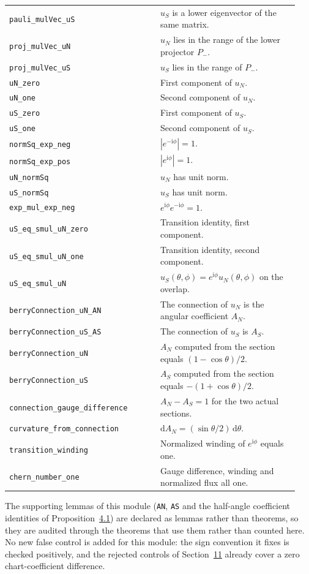\documentclass[11pt]{article}
\theoremstyle{definition}\newtheorem{definition}[theorem]{Definition}
\theoremstyle{remark}\newtheorem{remark}[theorem]{Remark}
\newcommand{\ii}{\mathrm{i}}
\newcommand{\dd}{\mathrm{d}}
\begin{document}
\begin{longtable}{p{0.49\linewidth}p{0.45\linewidth}}
\texttt{pauli\_mulVec\_uS} & $u_S$ is a lower eigenvector of the same matrix.\\
\texttt{proj\_mulVec\_uN} & $u_N$ lies in the range of the lower projector $P_-$.\\
\texttt{proj\_mulVec\_uS} & $u_S$ lies in the range of $P_-$.\\
\texttt{uN\_zero} & First component of $u_N$.\\
\texttt{uN\_one} & Second component of $u_N$.\\
\texttt{uS\_zero} & First component of $u_S$.\\
\texttt{uS\_one} & Second component of $u_S$.\\
\texttt{normSq\_exp\_neg} & $|e^{-\ii\phi}|=1$.\\
\texttt{normSq\_exp\_pos} & $|e^{\ii\phi}|=1$.\\
\texttt{uN\_normSq} & $u_N$ has unit norm.\\
\texttt{uS\_normSq} & $u_S$ has unit norm.\\
\texttt{exp\_mul\_exp\_neg} & $e^{\ii\phi}e^{-\ii\phi}=1$.\\
\texttt{uS\_eq\_smul\_uN\_zero} & Transition identity, first component.\\
\texttt{uS\_eq\_smul\_uN\_one} & Transition identity, second component.\\
\texttt{uS\_eq\_smul\_uN} & $u_S(\theta,\phi)=e^{\ii\phi}u_N(\theta,\phi)$ on the overlap.\\
\texttt{berryConnection\_uN\_AN} & The connection of $u_N$ is the angular coefficient $A_N$.\\
\texttt{berryConnection\_uS\_AS} & The connection of $u_S$ is $A_S$.\\
\texttt{berryConnection\_uN} & $A_N$ computed from the section equals $(1-\cos\theta)/2$.\\
\texttt{berryConnection\_uS} & $A_S$ computed from the section equals $-(1+\cos\theta)/2$.\\
\texttt{connection\_gauge\_difference} & $A_N-A_S=1$ for the two actual sections.\\
\texttt{curvature\_from\_connection} & $\dd A_N=(\sin\theta/2)\,\dd\theta$.\\
\texttt{transition\_winding} & Normalized winding of $e^{\ii\phi}$ equals one.\\
\texttt{chern\_number\_one} & Gauge difference, winding and normalized flux all one.\\\bottomrule
\end{longtable}
The supporting lemmas of this module (\texttt{AN}, \texttt{AS} and the half-angle coefficient
identities of Proposition~\hyperref[prop:charts]{4.1}) are declared as lemmas rather than theorems, so they are
audited through the theorems that use them rather than counted here. No new false control is added
for this module: the sign convention it fixes is checked positively, and the rejected controls of
Section~\hyperref[sec:formal]{11} already cover a zero chart-coefficient difference.
\end{document}
